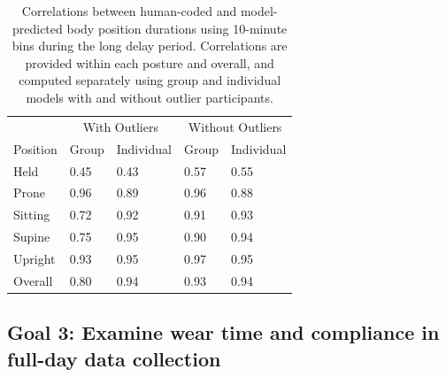 \documentclass[
  man]{apa6}
\begin{document}
\begin{table}[tbp]

\begin{center}
\begin{threeparttable}

\caption{\label{tab:pt2binstable}Correlations between human-coded and model-predicted body position durations using 10-minute bins during the long delay period. Correlations are provided within each posture and overall, and computed separately using group and individual models with and without outlier participants.}

\begin{tabular}{lllll}
\toprule
 & \multicolumn{2}{c}{With Outliers} & \multicolumn{2}{c}{Without Outliers} \\
\cmidrule(r){2-3} \cmidrule(r){4-5}
Position & Group & Individual & Group & Individual\\
\midrule
Held & 0.45 & 0.43 & 0.57 & 0.55\\
Prone & 0.96 & 0.89 & 0.96 & 0.88\\
Sitting & 0.72 & 0.92 & 0.91 & 0.93\\
Supine & 0.75 & 0.95 & 0.90 & 0.94\\
Upright & 0.93 & 0.95 & 0.97 & 0.95\\ \midrule
Overall & 0.80 & 0.94 & 0.93 & 0.94\\
\bottomrule
\end{tabular}

\end{threeparttable}
\end{center}

\end{table}

\hypertarget{goal-3-examine-wear-time-and-compliance-in-full-day-data-collection}{%
\subsection{Goal 3: Examine wear time and compliance in full-day data collection}\label{goal-3-examine-wear-time-and-compliance-in-full-day-data-collection}}
\end{document}
